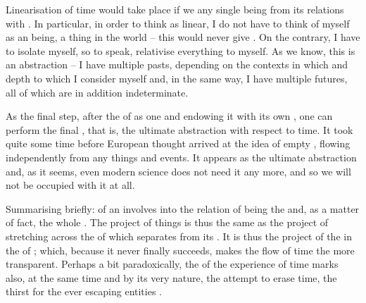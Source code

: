 \label{pa:mytime}
Linearisation of time would take place if we  any single being 
from its relations with . In particular, in order to 
think  as linear, I do not have to think of myself as 
an  being, a thing in the world -- this would never 
give . On the contrary, I have to isolate myself, so to speak, 
relativise everything to myself. As we know, this is an abstraction -- 
I have multiple pasts, depending on the contexts in which and depth to which I consider 
myself and, in the same way, I have multiple futures, all of which are in
addition indeterminate.
%

As the final step, after  the  of  as one
 and endowing it with its own , one can perform the final
, that is, the ultimate abstraction with respect to time.  It
took quite some time before European thought arrived at the idea of empty
, flowing independently from any things and
events.
It appears as the ultimate abstraction and, as it seems, even modern science
does not need it any more, and so we will not be occupied with it at all.

\pa%
Summarising briefly:  of an
 involves  into the relation of being  the
 and, as a matter of fact,  the whole . The
 project of  things is thus the same as the
project of stretching across the  of  which separates
 from its . It is thus the project of 
the  in the  of ; 
which, because it never finally succeeds, makes the flow of time the more
transparent. Perhaps a bit paradoxically, the  of the experience
of time marks also, at the same time and by its very nature, the attempt to
erase time, the thirst for the ever escaping entities . 

